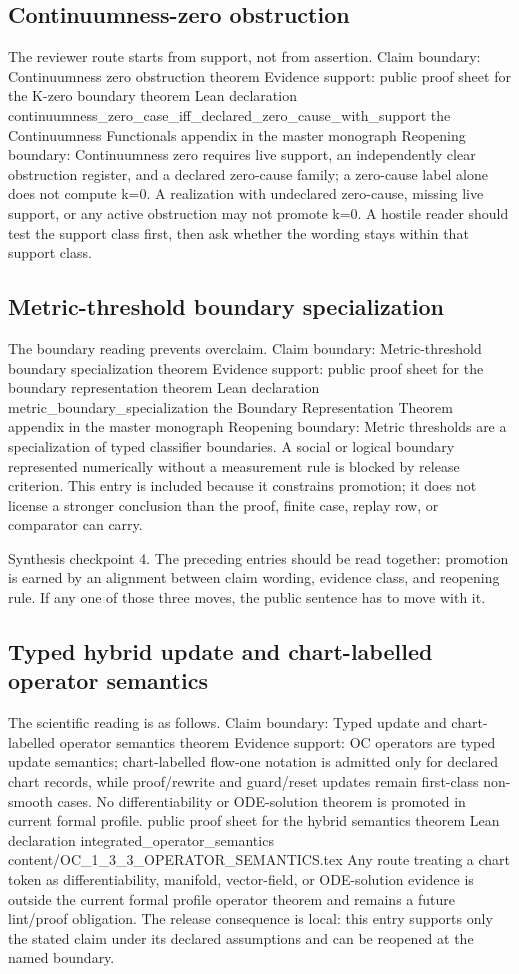 \subsection{Continuumness-zero obstruction}
The reviewer route starts from support, not from assertion. Claim boundary: Continuumness zero obstruction theorem Evidence support: public proof sheet for the K-zero boundary theorem Lean declaration continuumness\_zero\_case\_iff\_declared\_zero\_cause\_with\_support the Continuumness Functionals appendix in the master monograph Reopening boundary: Continuumness zero requires live support, an independently clear obstruction register, and a declared zero-cause family; a zero-cause label alone does not compute k=0. A realization with undeclared zero-cause, missing live support, or any active obstruction may not promote k=0. A hostile reader should test the support class first, then ask whether the wording stays within that support class.

\subsection{Metric-threshold boundary specialization}
The boundary reading prevents overclaim. Claim boundary: Metric-threshold boundary specialization theorem Evidence support: public proof sheet for the boundary representation theorem Lean declaration metric\_boundary\_specialization the Boundary Representation Theorem appendix in the master monograph Reopening boundary: Metric thresholds are a specialization of typed classifier boundaries. A social or logical boundary represented numerically without a measurement rule is blocked by release criterion. This entry is included because it constrains promotion; it does not license a stronger conclusion than the proof, finite case, replay row, or comparator can carry.

Synthesis checkpoint 4. The preceding entries should be read together: promotion is earned by an alignment between claim wording, evidence class, and reopening rule. If any one of those three moves, the public sentence has to move with it.

\subsection{Typed hybrid update and chart-labelled operator semantics}
The scientific reading is as follows. Claim boundary: Typed update and chart-labelled operator semantics theorem Evidence support: OC operators are typed update semantics; chart-labelled flow-one notation is admitted only for declared chart records, while proof/rewrite and guard/reset updates remain first-class non-smooth cases. No differentiability or ODE-solution theorem is promoted in current formal profile. public proof sheet for the hybrid semantics theorem Lean declaration integrated\_operator\_semantics content/OC\_1\_3\_3\_OPERATOR\_SEMANTICS.tex Any route treating a chart token as differentiability, manifold, vector-field, or ODE-solution evidence is outside the current formal profile operator theorem and remains a future lint/proof obligation. The release consequence is local: this entry supports only the stated claim under its declared assumptions and can be reopened at the named boundary.

